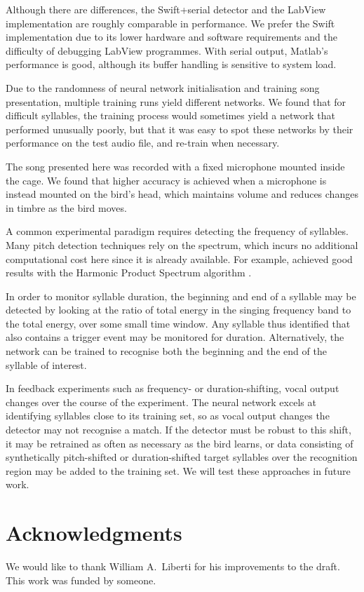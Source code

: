 \documentclass[10pt,letterpaper]{article}
\let\oldmarginpar\marginpar
\renewcommand{\marginpar}[1]{\oldmarginpar{\linespread{1}\scriptsize{#1}}}
\begin{document}
Although there are differences, the Swift+serial detector and the LabView implementation are roughly comparable in performance.  We prefer the Swift implementation due to its lower hardware and software requirements and the difficulty of debugging LabView programmes.  With serial output, Matlab's performance is good, although its buffer handling is sensitive to system load.

Due to the randomness of neural network initialisation and training song presentation, multiple training runs yield different networks.  We found that for difficult syllables, the training process would sometimes yield a network that performed unusually poorly, but that it was easy to spot these networks by their performance on the test audio file, and re-train when necessary.

The song presented here was recorded with a fixed microphone mounted inside the cage.  We found that higher accuracy is achieved when a microphone is instead mounted on the bird's head, which maintains volume and reduces changes in timbre as the bird moves.

A common experimental paradigm requires detecting the frequency of syllables.  Many pitch detection techniques rely on the spectrum, which incurs no additional computational cost here since it is already available.  For example, \cite{Canopoli2014} achieved good results with the Harmonic Product Spectrum algorithm \cite{Noll1970}.

In order to monitor syllable duration, the beginning and end of a syllable may be detected by looking at the ratio of total energy in the singing frequency band to the total energy, over some small time window.  Any syllable thus identified that also contains a trigger event may be monitored for duration.  Alternatively, the network can be trained to recognise both the beginning and the end of the syllable of interest.

In feedback experiments such as frequency- or duration-shifting, vocal output changes over the course of the experiment.  The neural network excels at identifying syllables close to its training set, so as vocal output changes the detector may not recognise a match.  If the detector must be robust to this shift, it may be retrained as often as necessary as the bird learns, or data consisting of synthetically pitch-shifted or duration-shifted target syllables over the recognition region may be added to the training set.  We will test these approaches in future work.

\section{Acknowledgments}
We would like to thank William A.~Liberti for his improvements to the draft.
This work was funded by someone.\marginpar{But by whom?}
\end{document}
